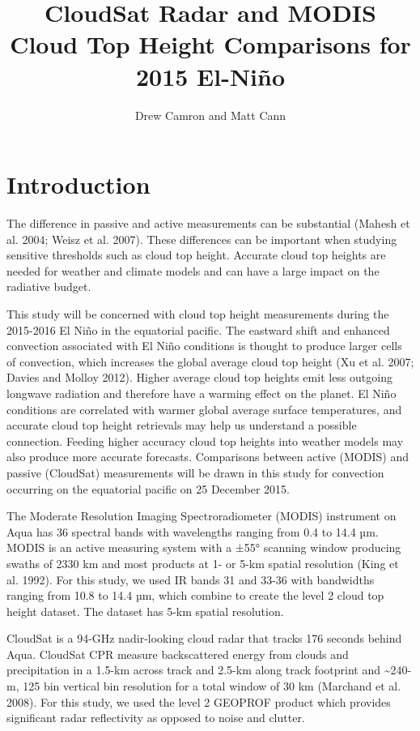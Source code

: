 \documentclass[11pt]{article}
\title{CloudSat Radar and MODIS Cloud Top Height Comparisons for 2015 El-Ni\~{n}o}
\author{Drew Camron and Matt Cann}
\begin{document}
    
    
    \maketitle
    


    \section{Introduction}\label{introduction}

The difference in passive and active measurements can be substantial
(Mahesh et al. 2004; Weisz et al. 2007). These differences can be
important when studying sensitive thresholds such as cloud top height.
Accurate cloud top heights are needed for weather and climate models and
can have a large impact on the radiative budget.

This study will be concerned with cloud top height measurements during
the 2015-2016 El Niño in the equatorial pacific. The eastward shift and
enhanced convection associated with El Niño conditions is thought to
produce larger cells of convection, which increases the global average
cloud top height (Xu et al. 2007; Davies and Molloy 2012). Higher
average cloud top heights emit less outgoing longwave radiation and
therefore have a warming effect on the planet. El Niño conditions are
correlated with warmer global average surface temperatures, and accurate
cloud top height retrievals may help us understand a possible
connection. Feeding higher accuracy cloud top heights into weather
models may also produce more accurate forecasts. Comparisons between
active (MODIS) and passive (CloudSat) measurements will be drawn in this
study for convection occurring on the equatorial pacific on 25 December
2015.

The Moderate Resolution Imaging Spectroradiometer (MODIS) instrument on
Aqua has 36 spectral bands with wavelengths ranging from 0.4 to 14.4 µm.
MODIS is an active measuring system with a ±55° scanning window
producing swaths of 2330 km and most products at 1- or 5-km spatial
resolution (King et al. 1992). For this study, we used IR bands 31 and
33-36 with bandwidths ranging from 10.8 to 14.4 µm, which combine to
create the level 2 cloud top height dataset. The dataset has 5-km
spatial resolution.

CloudSat is a 94-GHz nadir-looking cloud radar that tracks 176 seconds
behind Aqua. CloudSat CPR measure backscattered energy from clouds and
precipitation in a 1.5-km across track and 2.5-km along track footprint
and \textasciitilde{}240-m, 125 bin vertical bin resolution for a total
window of 30 km (Marchand et al. 2008). For this study, we used the
level 2 GEOPROF product which provides significant radar reflectivity as
opposed to noise and clutter.
\end{document}

